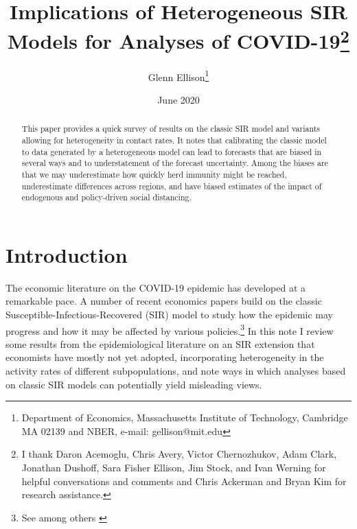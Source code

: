 \documentclass[11pt]{article}
\begin{document}
\title{Implications of Heterogeneous SIR Models for Analyses of COVID-19\thanks{I thank Daron Acemoglu, Chris Avery, Victor Chernozhukov, Adam Clark, Jonathan Dushoff, Sara Fisher Ellison, Jim Stock, and Ivan Werning for helpful conversations and comments and Chris Ackerman and Bryan Kim for research assistance.}}

\author{Glenn Ellison\thanks{ Department of Economics, Massachusetts Institute of Technology, Cambridge
MA 02139 and NBER, e-mail: \textsf{gellison@mit.edu}}}

\date{June 2020}

\maketitle

 \baselineskip 18pt 
\begin{abstract}
This paper provides a quick survey of results on the classic SIR model and variants allowing for heterogeneity in contact rates. It notes that calibrating the classic model to data generated by a heterogeneous model can lead to forecasts that are biased in several ways and to understatement of the forecast uncertainty. Among the biases are that we may underestimate how quickly herd immunity might be reached, underestimate differences across regions, and have biased estimates of the impact of endogenous and policy-driven social distancing. 

\end{abstract}

\baselineskip 18pt
\setcounter{page}{1}


\section{Introduction}

The economic literature on the COVID-19 epidemic has developed at a remarkable pace. A number of recent economics
papers build on the classic Susceptible-Infectious-Recovered (SIR) model to study how the epidemic may progress and 
how it may be affected by various policies.\footnote{See among others 
\citet{acemoglu2020multi,lippi2020simple, baqaee2020reopening, eichenbaum2020macroeconomics, farboodi2020internal, fernandez2020estimating, jones2020optimal, rowthorn2012optimal}
} 
In this note I review some results from the epidemiological literature on an SIR extension that economists
have mostly not yet adopted, incorporating heterogeneity in the activity rates of different subpopulations, and note ways 
in which analyses based on classic SIR models  can potentially yield misleading views.
\end{document}
